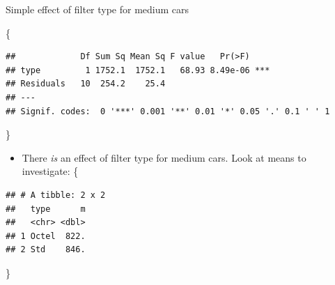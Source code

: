 \documentclass[ignorenonframetext,]{beamer}
\newenvironment{Shaded}{\begin{snugshade}}{\end{snugshade}}
\newcommand{\DataTypeTok}[1]{\textcolor[rgb]{0.13,0.29,0.53}{#1}}
\newcommand{\KeywordTok}[1]{\textcolor[rgb]{0.13,0.29,0.53}{\textbf{#1}}}
\newcommand{\NormalTok}[1]{#1}
\newcommand{\OperatorTok}[1]{\textcolor[rgb]{0.81,0.36,0.00}{\textbf{#1}}}
\newcommand{\StringTok}[1]{\textcolor[rgb]{0.31,0.60,0.02}{#1}}
\providecommand{\tightlist}{%
  \setlength{\itemsep}{0pt}\setlength{\parskip}{0pt}}
\begin{document}
\begin{frame}[fragile]{Simple effect of filter type for medium cars}
\protect\hypertarget{simple-effect-of-filter-type-for-medium-cars}{}

\{\small

\begin{Shaded}
\end{Shaded}

\begin{verbatim}
##             Df Sum Sq Mean Sq F value   Pr(>F)    
## type         1 1752.1  1752.1   68.93 8.49e-06 ***
## Residuals   10  254.2    25.4                     
## ---
## Signif. codes:  0 '***' 0.001 '**' 0.01 '*' 0.05 '.' 0.1 ' ' 1
\end{verbatim}

\}

\begin{itemize}
\tightlist
\item
  There \emph{is} an effect of filter type for medium cars. Look at
  means to investigate: \{\footnotesize
\end{itemize}

\begin{Shaded}
\end{Shaded}

\begin{verbatim}
## # A tibble: 2 x 2
##   type      m
##   <chr> <dbl>
## 1 Octel  822.
## 2 Std    846.
\end{verbatim}

\}

\end{frame}
\end{document}
